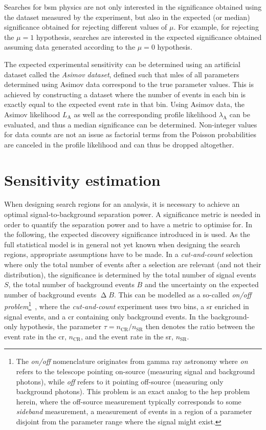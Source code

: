Searches for \gls{bsm} physics are not only interested in the significance obtained using the dataset measured by the experiment, but also in the expected (or median) significance obtained for rejecting different values of $\mu$.
For example, for rejecting the $\mu = 1$ hypothesis, searches are interested in the expected significance obtained assuming data generated according to the $\mu = 0$ hypothesis.

The expected experimental sensitivity can be determined using an artificial dataset called the \textit{Asimov dataset}, defined such that \glspl{mle} of all parameters determined using Asimov data correspond to the true parameter values.
This is achieved by constructing a dataset where the number of events in each bin is exactly equal to the expected event rate in that bin. Using Asimov data, the Asimov likelihood $L_\mathrm{A}$ as well as the corresponding profile likelihood $\lambda_\mathrm{A}$ can be evaluated, and thus a median significance can be determined.
Non-integer values for data counts are not an issue as factorial terms from the Poisson probabilities are canceled in the profile likelihood and can thus be dropped altogether. 

\section{Sensitivity estimation}\label{sec:sensitivity_estimation}

When designing search regions for an analysis, it is necessary to achieve an optimal signal-to-background separation power.
A significance metric is needed in order to quantify the separation power and to have a metric to optimise for.
In the following, the expected discovery significance introduced in \cite{Cousins:2007bmb} is used. As the full statistical model is in general not yet known when designing the search regions, appropriate assumptions have to be made. In a \textit{cut-and-count} selection where only the total number of events after a selection are relevant (and not \eg their distribution), the significance is determined by the total number of signal events $S$, the total number of background events $B$ and the uncertainty on the expected number of background events $\upDelta B$.
This can be modelled as a so-called \textit{on/off problem}\footnote{The \textit{on/off} nomenclature originates from gamma ray astronomy where \textit{on} refers to the telescope pointing on-source (measuring signal and background photons), while \textit{off} refers to it pointing off-source (measuring only background photons). This problem is an exact analog to the \gls{hep} problem herein, where the off-source measurement typically corresponds to some \textit{sideband} measurement, \ie a measurement of events in a region of a parameter disjoint from the parameter range where the signal might exist.}~\cite{Cousins:2007bmb, Cranmer:2005hi}, where the \textit{cut-and-count} experiment uses two bins, a \gls{sr} enriched in signal events, and a \gls{cr} containing only background events.
In the background-only hypothesis, the parameter $\tau = n_\mathrm{CR} / n_\mathrm{SR}$ then denotes the ratio between the event rate in the \gls{cr}, $n_\mathrm{CR}$, and the event rate in the \gls{sr}, $n_\mathrm{SR}$.

